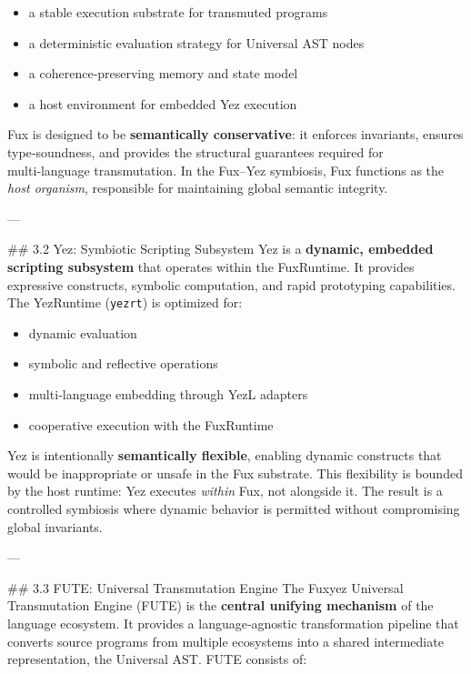 \begin{itemize}
  \item a stable execution substrate for transmuted programs  
  \item a deterministic evaluation strategy for Universal AST nodes  
  \item a coherence‑preserving memory and state model  
  \item a host environment for embedded Yez execution  
\end{itemize}

Fux is designed to be \textbf{semantically conservative}: it enforces invariants, ensures type‑soundness, and provides the structural guarantees required for multi‑language transmutation. In the Fux–Yez symbiosis, Fux functions as the \textit{host organism}, responsible for maintaining global semantic integrity.

---

\#\# 3.2 Yez: Symbiotic Scripting Subsystem  
Yez is a \textbf{dynamic, embedded scripting subsystem} that operates within the FuxRuntime. It provides expressive constructs, symbolic computation, and rapid prototyping capabilities. The YezRuntime (\texttt{yezrt}) is optimized for:

\begin{itemize}
  \item dynamic evaluation  
  \item symbolic and reflective operations  
  \item multi‑language embedding through YezL adapters  
  \item cooperative execution with the FuxRuntime  
\end{itemize}

Yez is intentionally \textbf{semantically flexible}, enabling dynamic constructs that would be inappropriate or unsafe in the Fux substrate. This flexibility is bounded by the host runtime: Yez executes \textit{within} Fux, not alongside it. The result is a controlled symbiosis where dynamic behavior is permitted without compromising global invariants.

---

\#\# 3.3 FUTE: Universal Transmutation Engine  
The Fuxyez Universal Transmutation Engine (FUTE) is the \textbf{central unifying mechanism} of the language ecosystem. It provides a language‑agnostic transformation pipeline that converts source programs from multiple ecosystems into a shared intermediate representation, the Universal AST. FUTE consists of:

